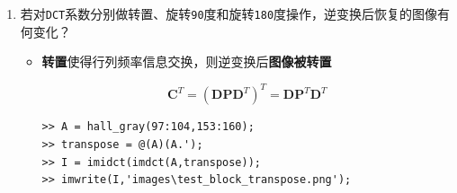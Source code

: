 \documentclass{article}
\numberwithin{figure}{section}
\numberwithin{table}{section}
\numberwithin{listing}{section}
\numberwithin{equation}{section}
\begin{document}
\begin{enumerate}
            \item 若对\texttt{DCT}系数分别做转置、旋转\texttt{90}度和旋转\texttt{180}度操作，逆变换后恢复的图像有何变化？

                \begin{itemize}
                    \item \textbf{转置}使得行列频率信息交换，则逆变换后\textbf{图像被转置}

                        \[
                            \mathbf{C}^T = (\mathbf{DPD}^T)^T = \mathbf{DP}^T\mathbf{D}^T
                        \]

                        \begin{verbatim}
>> A = hall_gray(97:104,153:160);
>> transpose = @(A)(A.');
>> I = imidct(imdct(A,transpose));
>> imwrite(I,'images\test_block_transpose.png');
                        \end{verbatim}


\end{itemize}
\end{enumerate}
\end{document}
